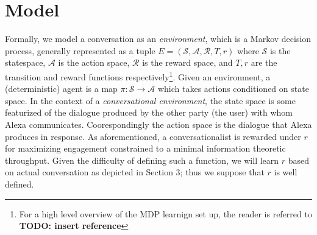 \documentclass{article} %
\theoremstyle{named}
\def\scripta{{\mathcal A}}
\def\scriptr{{\mathcal R}}
\def\scripts{{\mathcal S}}
\begin{document}
\section{Model}
\begin{columns}
    \begin{column}{0.5\textwidth}
        \begin{figure*}
        	
          \caption{DDPG architecture}
          \end{figure*}
      \end{column}}
     \begin{column}{0.5\textwidth}
        \begin{figure*}
        	\texttt{[image: jamesdiag]}
          \caption{System architecture}
        \end{figure*}
    \end{column}
\end{columns}
Formally, we model a conversation as an \emph{environment}, which is a Markov decision process, generally represented as a tuple $E=(\scripts, \scripta, \scriptr, T, r)$ where $\scripts$ is the statespace, $\scripta$ is the action space, $\scriptr$ is the reward space, and $T, r$ are the transition and reward functions respectively\footnote{For a high level overview of the MDP learnign set up, the reader is referred to \textbf{ TODO: insert reference}}. Given an environment, a (deterministic) agent is a map $\pi: \scripts \to \scripta$ which takes actions conditioned on state space. In the context of a \emph{conversational environment}, the state space is some featurized of the dialogue produced by the other party (the user) with whom Alexa communicates. Coorespondingly the action space is the dialogue that Alexa produces in response. As aforementioned, a conversationalist is rewarded under $r$ for maximizing engagement constrained to a minimal information theoretic throughput. Given the difficulty of defining such a function, we will learn $r$ based on actual conversation as depicted in Section 3; thus we suppose that $r$ is well defined.
\end{document}
